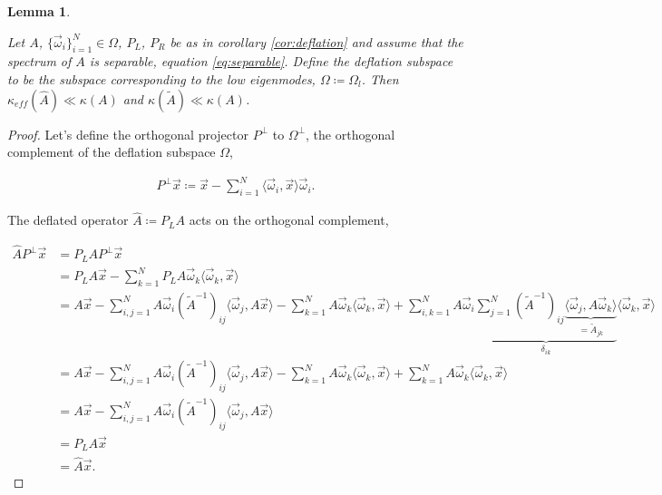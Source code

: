 \documentclass{article}
\theoremstyle{plain} %
\newtheorem{lemma}[theorem]{Lemma}
\theoremstyle{convention} %
\theoremstyle{remark} %
\numberwithin{equation}{section}
\begin{document}
\begin{lemma}
\label{lem:condition_number}

Let $A$, $\{\vec{\omega}_i\}_{i=1}^N \in \Omega$, $P_L$, $P_R$ be as in corollary \ref{cor:deflation} and assume that the spectrum of $A$ is separable, equation \eqref{eq:separable}. Define the deflation subspace to be the subspace corresponding to the low eigenmodes, $\Omega \coloneqq \Omega_l$. Then $\kappa_{eff}(\hat{A}) \ll \kappa(A)$ and $\kappa(\tilde{A}) \ll \kappa(A)$.
\end{lemma}

\begin{proof}

Let's define the orthogonal projector $P^{\perp}$ to $\Omega^{\perp}$, the orthogonal complement of the deflation subspace $\Omega$,

\begin{align*}
    P^{\perp} \vec{x} \coloneqq \vec{x} - \sum_{i=1}^N \langle \vec{\omega}_i, \vec{x} \rangle \vec{\omega}_i.
\end{align*}

The deflated operator $\hat{A} \coloneqq P_L A$ acts on the orthogonal complement,

\begin{align*}
    \hat{A} P^{\perp} \vec{x} &= P_L A P^{\perp} \vec{x} \\
    &= P_L A \vec{x} - \sum_{k=1}^N P_L A \vec{\omega}_k \langle \vec{\omega}_k, \vec{x} \rangle \\
    &= A \vec{x} - \sum_{i,j=1}^N A \vec{\omega}_i (\widetilde{A}^{-1})_{ij} \langle \vec{\omega}_j, A \vec{x} \rangle - \sum_{k=1}^N A \vec{\omega}_k \langle \vec{\omega}_k, \vec{x} \rangle + \sum_{i,k=1}^N A \vec{\omega}_i \underbrace{ \sum_{j=1}^N (\widetilde{A}^{-1})_{ij} \underbrace{\langle \vec{\omega}_j, A \vec{\omega}_k \rangle}_{=\widetilde{A}_{jk}} }_{\delta_{ik}} \langle \vec{\omega}_k, \vec{x} \rangle \\
    &= A \vec{x} - \sum_{i,j=1}^N A \vec{\omega}_i (\widetilde{A}^{-1})_{ij} \langle \vec{\omega}_j, A \vec{x} \rangle - \sum_{k=1}^N A \vec{\omega}_k \langle \vec{\omega}_k, \vec{x} \rangle + \sum_{k=1}^N A \vec{\omega}_k \langle \vec{\omega}_k, \vec{x} \rangle \\
    &= A \vec{x} - \sum_{i,j=1}^N A \vec{\omega}_i (\widetilde{A}^{-1})_{ij} \langle \vec{\omega}_j, A \vec{x} \rangle \\
    &= P_L A \vec{x} \\
    &= \hat{A} \vec{x}.
\end{align*}


\end{proof}
\end{document}
